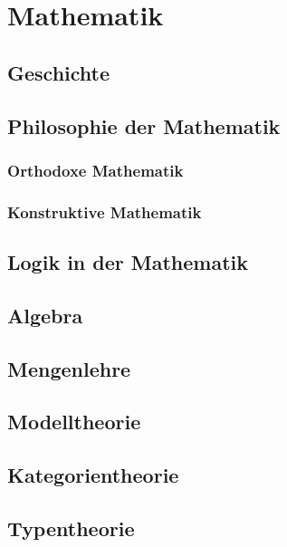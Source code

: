 \chapter{Mathematik}

\section{Geschichte}

\section{Philosophie der Mathematik}

\subsection{Orthodoxe Mathematik}

\subsection{Konstruktive Mathematik}

\section{Logik in der Mathematik}

\section{Algebra}

\section{Mengenlehre}

\section{Modelltheorie}

\section{Kategorientheorie}

\section{Typentheorie}
